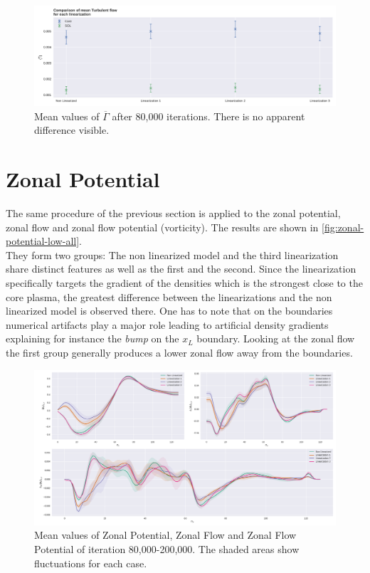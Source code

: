 \documentclass[master.tex]{subfiles}
\newcommand{\Tflow}[0]{\overline{\Gamma}}
\begin{document}
\begin{figure}[!htbp]
    \includegraphics[width=\linewidth]{pdfs/turbulent-flow-low-means.pdf}
    \caption{Mean values of $\Tflow$ after 80,000 iterations. There is no apparent difference visible.}
    \label{fig:turbulent-flow-low-means}
\end{figure}

\section{Zonal Potential}

The same procedure of the previous section is applied to the zonal potential, zonal flow and zonal flow potential (vorticity). The results are shown in \autoref{fig:zonal-potential-low-all}.\\
They form two groups: The non linearized model and the third linearization share distinct features as well as the first and the second. Since the linearization specifically targets the gradient of the densities which is the strongest close to the core plasma, the greatest difference between the linearizations and the non linearized model is observed there. One has to note that on the boundaries numerical artifacts play a major role leading to artificial density gradients explaining for instance the \textit{bump} on the $x_L$ boundary. Looking at the zonal flow the first group generally produces a lower zonal flow away from the boundaries.

\begin{figure}[!htbp]
    \includegraphics[width=\linewidth]{pdfs/zonal_potential_low.pdf}
    \caption{Mean values of Zonal Potential, Zonal Flow and Zonal Flow Potential of iteration 80,000-200,000. The shaded areas show fluctuations for each case.}
    \label{fig:zonal-potential-low-all}
\end{figure}
\end{document}
